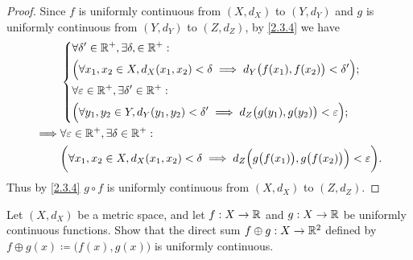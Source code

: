 \begin{proof}
  Since \(f\) is uniformly continuous from \((X, d_X)\) to \((Y, d_Y)\) and \(g\) is uniformly continuous from \((Y, d_Y)\) to \((Z, d_Z)\), by \cref{2.3.4} we have
  \begin{align*}
             & \begin{dcases}
                 \forall \delta' \in \mathbb{R}^+, \exists \delta, \in \mathbb{R}^+ :                                                     \\
                 \Big(\forall x_1, x_2 \in X, d_X(x_1, x_2) < \delta \implies d_Y\big(f(x_1), f(x_2)\big) < \delta'\Big); \\
                 \forall \varepsilon \in \mathbb{R}^+, \exists \delta' \in \mathbb{R}^+ :                                                 \\
                 \Big(\forall y_1, y_2 \in Y, d_Y(y_1, y_2) < \delta' \implies d_Z\big(g(y_1), g(y_2)\big) < \varepsilon\Big);
               \end{dcases}                         \\
    \implies & \forall \varepsilon \in \mathbb{R}^+, \exists \delta \in \mathbb{R}^+ :                                                                              \\
             & \bigg(\forall x_1, x_2 \in X, d_X(x_1, x_2) < \delta \implies d_Z\Big(g\big(f(x_1)\big), g\big(f(x_2)\big)\Big) < \varepsilon\bigg).
  \end{align*}
  Thus by \cref{2.3.4} \(g \circ f\) is uniformly continuous from \((X, d_X)\) to \((Z, d_Z)\).
\end{proof}

\begin{ex}\label{ex:2.3.5}
  Let \((X, d_X)\) be a metric space, and let \(f : X \to \mathbb{R}\) and \(g : X \to \mathbb{R}\) be uniformly continuous functions.
  Show that the direct sum \(f \oplus g : X \to \mathbb{R}^2\) defined by \(f \oplus g(x) \coloneqq \big(f(x), g(x)\big)\) is uniformly continuous.
\end{ex}

